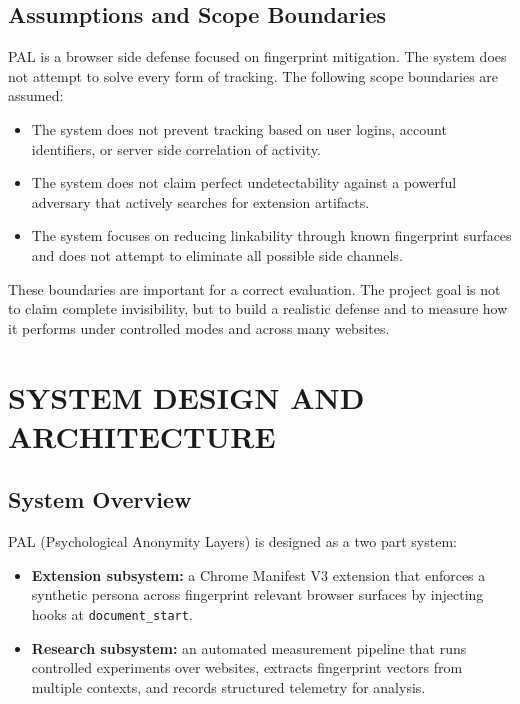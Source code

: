 \documentclass[11pt]{report}
\begin{document}
\section{Assumptions and Scope Boundaries}

PAL is a browser side defense focused on fingerprint mitigation. The system does not attempt to solve every form of tracking. The following scope boundaries are assumed:

\begin{itemize}
    \item The system does not prevent tracking based on user logins, account identifiers, or server side correlation of activity.
    \item The system does not claim perfect undetectability against a powerful adversary that actively searches for extension artifacts.
    \item The system focuses on reducing linkability through known fingerprint surfaces and does not attempt to eliminate all possible side channels.
\end{itemize}

These boundaries are important for a correct evaluation. The project goal is not to claim complete invisibility, but to build a realistic defense and to measure how it performs under controlled modes and across many websites.



\chapter{SYSTEM DESIGN AND ARCHITECTURE}

\section{System Overview}

PAL (Psychological Anonymity Layers) is designed as a two part system:

\begin{itemize}
    \item \textbf{Extension subsystem:} a Chrome Manifest V3 extension that enforces a synthetic persona across fingerprint relevant browser surfaces by injecting hooks at \texttt{document\_start}.
    \item \textbf{Research subsystem:} an automated measurement pipeline that runs controlled experiments over websites, extracts fingerprint vectors from multiple contexts, and records structured telemetry for analysis.
\end{itemize}
\end{document}
